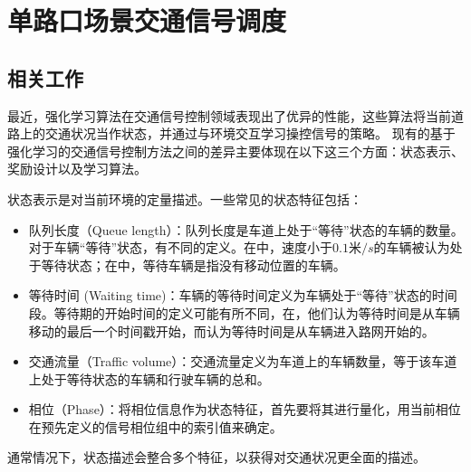 
\chapter{单路口场景交通信号调度}
\section{相关工作}
最近，强化学习算法在交通信号控制领域表现出了优异的性能，这些算法将当前道路上的交通状况当作状态，并通过与环境交互学习操控信号的策略。
现有的基于强化学习的交通信号控制方法之间的差异主要体现在以下这三个方面：状态表示、奖励设计以及学习算法。

状态表示是对当前环境的定量描述。一些常见的状态特征包括：
\begin{itemize}
  \item 队列长度（Queue length）：队列长度是车道上处于“等待”状态的车辆的数量。对于车辆“等待”状态，有不同的定义。在中，速度小于$0.1\text{米}/s$的车辆被认为处于等待状态；在中，等待车辆是指没有移动位置的车辆。
  \item 等待时间 (Waiting time)：车辆的等待时间定义为车辆处于“等待”状态的时间段。等待期的开始时间的定义可能有所不同，在，他们认为等待时间是从车辆移动的最后一个时间戳开始，而认为等待时间是从车辆进入路网开始的。
  \item 交通流量（Traffic volume）：交通流量定义为车道上的车辆数量，等于该车道上处于等待状态的车辆和行驶车辆的总和。
  \item 相位（Phase）：将相位信息作为状态特征，首先要将其进行量化，用当前相位在预先定义的信号相位组中的索引值来确定。
\end{itemize}
通常情况下，状态描述会整合多个特征，以获得对交通状况更全面的描述。

